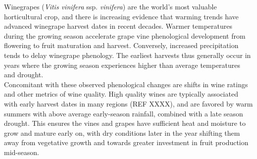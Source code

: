 \documentclass[final]{nature}
\begin{document}
\noindent Winegrapes (\emph{Vitis vinifera} ssp. \emph{vinifera}) are the world's most valuable horticultural crop, and there is increasing evidence that warming trends have advanced winegrape harvest dates in recent decades\cite{Duchene:2005bd,Jones:2000br,schultzjones,Seguin2005,tomasi2011,odo2012,webb2012}. Warmer temperatures during the growing season accelerate grape vine phenological development from flowering to fruit maturation and harvest. Conversely, increased precipitation tends to delay winegrape phenology\cite{jones2013}. The earliest harvests thus generally occur in years where the growing season experiences higher than average temperatures and drought\cite{Jones:2000br}.\\
\indent Concomitant with these observed phenological changes are shifts in wine ratings\cite{jones2005} and other metrics of wine quality\cite{Jones:2000br,mori2007}. High quality wines are typically associated with early harvest dates in many regions (REF XXXX), and are favored by warm summers with above average early-season rainfall, combined with a late season drought. This ensures the vines and grapes have sufficient heat and moisture to grow and mature early on, with dry conditions later in the year shifting them away from vegetative growth and towards greater investment in fruit production mid-season\cite{chaves2010,jones2013,baciocco2014}.\\
\end{document}
